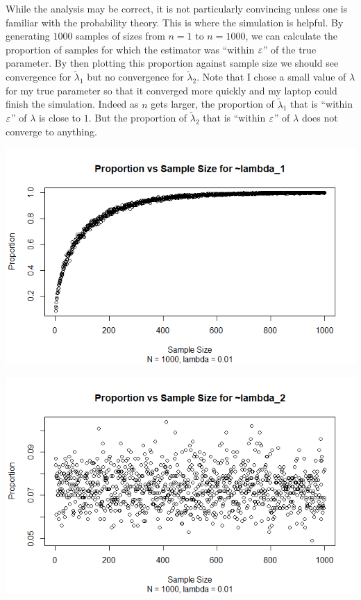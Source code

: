 While the analysis may be correct, it is not particularly convincing unless one is familiar with the probability theory. This is
where the simulation is helpful. By generating $1000$ samples of sizes from $n=1$ to $n=1000$, we can calculate the proportion of
samples for which the estimator was ``within ${\varepsilon}$'' of the true parameter. By then plotting this proportion against sample size
we should see convergence for $\tilde{\lambda}_1$ but no convergence for $\tilde{\lambda}_2$. Note that I chose a small value of
$\lambda$ for my true parameter so that it converged more quickly and my laptop could finish the simulation. Indeed as $n$ gets
larger, the proportion of $\tilde{\lambda}_1$ that is ``within ${\varepsilon}$'' of $\lambda$ is close to $1$. But the proportion of
$\tilde{\lambda}_2$ that is ``within ${\varepsilon}$'' of $\lambda$ does not converge to anything.

\begin{center}
	\includegraphics[scale=0.8]{proportion_plot_lambda_1.png}
	
	\includegraphics[scale=0.8]{proportion_plot_lambda_2.png}
\end{center}
